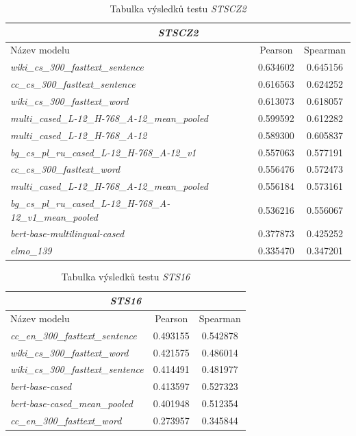 \documentclass[thesis=M,czech]{FITthesis}[2019/12/23]
\begin{document}
\begin{table}[h!]
\centering
\begin{tabular}{ |l|c|c| }
 \hline
 \multicolumn{3}{|c|}{\textit{STSCZ2}} \\\hline
 \hline
  Název modelu & Pearson & Spearman \\\hline
\textit{wiki\_cs\_300\_fasttext\_sentence} & 0.634602 & 0.645156\\
\textit{cc\_cs\_300\_fasttext\_sentence} & 0.616563 & 0.624252\\
\textit{wiki\_cs\_300\_fasttext\_word} & 0.613073 & 0.618057\\
\textit{multi\_cased\_L-12\_H-768\_A-12\_mean\_pooled} & 0.599592 & 0.612282\\\hline
\textit{multi\_cased\_L-12\_H-768\_A-12} & 0.589300 & 0.605837\\
\textit{bg\_cs\_pl\_ru\_cased\_L-12\_H-768\_A-12\_v1} & 0.557063 & 0.577191\\
\textit{cc\_cs\_300\_fasttext\_word} & 0.556476 & 0.572473\\
\textit{multi\_cased\_L-12\_H-768\_A-12\_mean\_pooled} & 0.556184 & 0.573161\\\hline
\textit{bg\_cs\_pl\_ru\_cased\_L-12\_H-768\_A-12\_v1\_mean\_pooled} & 0.536216 & 0.556067\\
\textit{bert-base-multilingual-cased} & 0.377873 & 0.425252\\
\textit{elmo\_139} & 0.335470 & 0.347201\\\hline
\end{tabular}
\caption{Tabulka výsledků testu \textit{STSCZ2}}
\label{table:STSCZ2}
\end{table}

\begin{table}[h!]
\centering
\begin{tabular}{ |l|c|c| }
 \hline
 \multicolumn{3}{|c|}{\textit{STS16}} \\\hline
 \hline
  Název modelu & Pearson & Spearman \\\hline
\textit{cc\_en\_300\_fasttext\_sentence} & 0.493155 & 0.542878\\
\textit{wiki\_cs\_300\_fasttext\_word} & 0.421575 & 0.486014\\
\textit{wiki\_cs\_300\_fasttext\_sentence} & 0.414491 & 0.481977\\
\textit{bert-base-cased} & 0.413597 & 0.527323\\
\textit{bert-base-cased\_mean\_pooled} & 0.401948 & 0.512354\\
\textit{cc\_en\_300\_fasttext\_word} & 0.273957 & 0.345844\\\hline
\end{tabular}
\caption{Tabulka výsledků testu \textit{STS16}}
\label{table:STS16}
\end{table}
\end{document}

